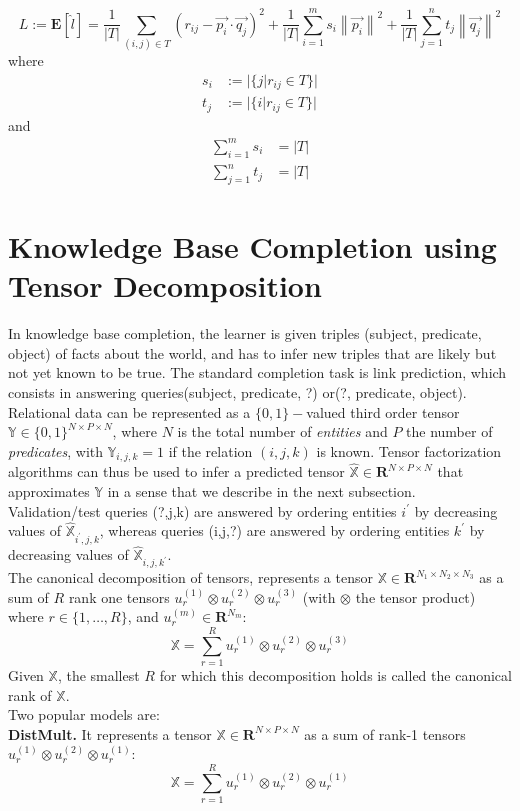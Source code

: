 \documentclass[11pt, english]{article}
\newcommand\norm[1]{\left\lVert#1\right\rVert}
\begin{document}
 \begin{equation}
    L:= \mathbf{E}[\hat{l}]=\frac{1}{|T|}\sum\limits_{(i,j)\in T}(r_{ij}-\vec{p_{i}}\cdot\vec{q_{j}})^2+\frac{1}{|T|}\sum\limits_{i=1}^{m} s_i\norm{\vec{p_i}}^2+\frac{1}{|T|}\sum\limits_{j=1}^{n} t_j\norm{\vec{q_{j}}}^2
 \end{equation}
 where
 \begin{align}
      s_i &:=  |\{j|r_{ij}\in T\}| \\
      t_j  &:=  |\{i|r_{ij} \in T\}|
 \end{align}
 and 
 \begin{align}
     \sum\limits_{i=1}^{m} s_i &= |T|  \\
     \sum\limits_{j=1}^{n} t_j &= |T|
 \end{align}

\section{Knowledge Base Completion using Tensor Decomposition}
In knowledge base completion, the learner is given triples (subject, predicate, object) of facts about the world, and has to infer new triples that are likely but not yet known to be true. The standard completion task is link prediction, which consists in answering queries(subject, predicate, ?) or(?, predicate, object).\\
Relational data can be represented as a $\{0,1\}-$valued third order tensor $\mathbb{Y} \in \{0,1\}^{N \times P \times N}$, where $N$ is the total number of \textit{entities} and $P$ the number of \textit{predicates}, with $\mathbb{Y}_{i,j,k}=1$ if the relation $(i,j,k)$ is known. Tensor factorization algorithms can thus be used to infer a predicted tensor $\hat{\mathbb{X}} \in \mathbf{R}^{N \times P \times N}$ that approximates $\mathbb{Y}$ in a sense that we describe in the next subsection. Validation/test queries (?,j,k) are answered by ordering entities $i^'$ by decreasing values of $\hat{\mathbb{X}}_{i^',j,k}$, whereas queries (i,j,?) are answered by ordering entities $k^'$ by decreasing values of $\hat{\mathbb{X}}_{i,j,k^'}$.\\
The canonical decomposition of tensors, represents a tensor $\mathbb{X} \in \mathbf{R}^{N_1 \times N_2 \times N_3}$ as a sum of $R$ rank one tensors $u_{r}^{(1)} \otimes u_{r}^{(2)} \otimes u_{r}^{(3)}$ (with $\otimes$ the tensor product) where $r \in \{1, \ldots , R\}$, and $u_{r}^{(m)} \in \mathbf{R}^{N_m}$:
\begin{equation}
    \mathbb{X}=\sum \limits_{r=1}^{R} u_{r}^{(1)} \otimes u_{r}^{(2)} \otimes u_{r}^{(3)}
\end{equation}
Given $\mathbb{X}$, the smallest $R$ for which this decomposition holds is called the canonical rank of $\mathbb{X}$.\\
Two popular models are:\\
\textbf{DistMult.} It represents a tensor $\mathbb{X} \in \mathbf{R}^{N \times P \times N}$ as a sum of rank-1 tensors $u_{r}^{(1)} \otimes u_{r}^{(2)} \otimes u_{r}^{(1)}$:
\begin{equation}
    \mathbb{X}=\sum\limits_{r=1}^{R} u_{r}^{(1)} \otimes u_{r}^{(2)} \otimes u_{r}^{(1)}
\end{equation}
\end{document}
